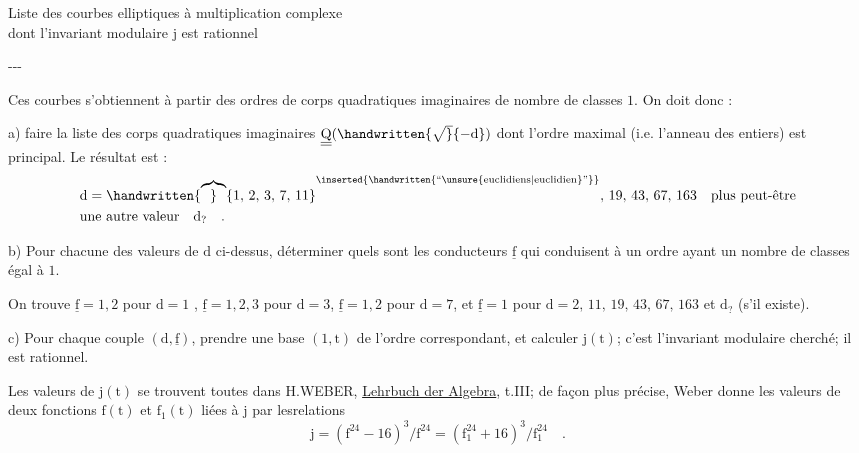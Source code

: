 \clearpage
{}
\reversemarginpar
{}
\normalmarginpar
{}

\begin{center}
Liste des courbes elliptiques à multiplication complexe\\
dont l'invariant modulaire $\mathrm{j}$ est rationnel

\medskip
-{}-{}-
\end{center}

Ces courbes s'obtiennent à partir des ordres de corps quadratiques imaginaires de nombre de classes $1$. On doit donc :

a) faire la liste des corps quadratiques imaginaires $\underline{\underline{\mathrm{Q}}}(\handwritten{\sqrt}{-\mathrm{d}})$ dont l'ordre maximal (i.e. l'anneau des entiers) est principal. Le résultat est :
\reversemarginpar
{}
\normalmarginpar
\[
\begin{aligned}
&\mathrm{d} = \handwritten{\overbrace}{1,\,2,\,3,\,7,\,11}^{\inserted{\handwritten{\text{``\unsure{euclidiens|euclidien}''}}}},\,19,\,43,\,67,\,163 \quad \text{plus peut-être}\\
&\text{une autre valeur}\quad \mathrm{d}_{?}\quad .
\end{aligned}
\]

b) Pour chacune des valeurs de $\mathrm{d}$ ci-dessus, déterminer quels sont les conducteurs $\underline{\mathrm{f}}$ qui conduisent à un ordre ayant un nombre de classes égal à $1$.

On trouve $\underline{\mathrm{f}}=1,2$ pour $\mathrm{d}=1$ , $\underline{\mathrm{f}}=1,2,3$ pour $\mathrm{d}=3$, $\underline{\mathrm{f}}=1,2$ pour $\mathrm{d}=7$, et $\underline{\mathrm{f}}=1$ pour $\mathrm{d}=2,\,11,\,19,\,43,\,67,\,163$ et $\mathrm{d}_{?}$ (s'il existe).

c) Pour chaque couple $(\mathrm{d},\underline{\mathrm{f}})$, prendre une base $(1,\mathrm{t})$ de l'ordre correspondant, et calculer $\mathrm{j}(\mathrm{t})$; c'est l'invariant modulaire cherché; il est rationnel.

Les valeurs de $\mathrm{j}(\mathrm{t})$ se trouvent toutes dans H.WEBER, \uline{Lehrbuch der Algebra}, t.III; de façon plus précise, Weber donne les valeurs de deux fonctions $\mathrm{f}(\mathrm{t})$ et $\mathrm{f}_{1}(\mathrm{t})$ liées à $\mathrm{j}$ par lesrelations
\[
\mathrm{j}=(\mathrm{f}^{24}-16)^{3}/\mathrm{f}^{24}
       =(\mathrm{f}_{1}^{24}+16)^{3}/\mathrm{f}_{1}^{24}\quad .
\]

